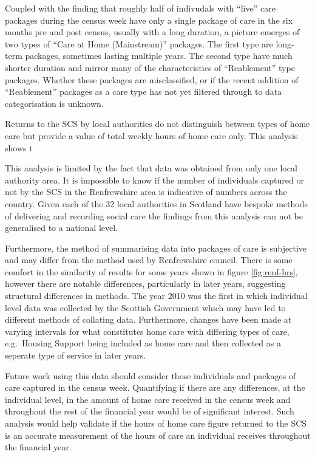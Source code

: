 \documentclass[]{article}
\begin{document}
Coupled with the finding that roughly half of indivudals with ``live''
care packages during the census week have only a single package of care
in the six months pre and post census, usually with a long duration, a
picture emerges of two types of ``Care at Home (Mainstream)'' packages.
The first type are long-term packages, sometimes lasting multiple years.
The second type have much shorter duration and mirror many of the
characteristics of ``Reablement'' type packages. Whether these packages
are misclassified, or if the recent addition of ``Reablement'' packages
as a care type has not yet filtered through to data categorisation is
unknown.

Returns to the SCS by local authorities do not distinguish between types
of home care but provide a value of total weekly hours of home care
only. This analysis shows t

This analysis is limited by the fact that data was obtained from only
one local authority area. It is impossible to know if the number of
individuals captured or not by the SCS in the Renfrewshire area is
indicative of numbers across the country. Given each of the 32 local
authorities in Scotland have bespoke methods of delivering and recording
social care the findings from this analysis can not be generalised to a
national level.

Furthermore, the method of summarising data into packages of care is
subjective and may differ from the method used by Renfrewshire council.
There is some comfort in the similarity of results for some years shown
in figure \ref{fig:renf-hrs}, however there are notable differences,
particularly in later years, suggesting structural differences in
methods. The year 2010 was the first in which individual level data was
collected by the Scottish Government which may have led to different
methods of collating data. Furthermore, changes have been made at
varying intervals for what constitutes home care with differing types of
care, e.g.~Housing Support being included as home care and then
collected as a seperate type of service in later years.

Future work using this data should consider those individuals and
packages of care captured in the census week. Quantifying if there are
any differences, at the individual level, in the amount of home care
received in the census week and throughout the rest of the financial
year would be of significant interest. Such analysis would help validate
if the hours of home care figure returned to the SCS is an accurate
measurement of the hours of care an individual receives throughout the
financial year.
\end{document}

